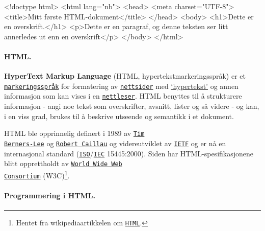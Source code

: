\documentclass[%
oneside,                 %
final,                   %
10pt]{article}
\newenvironment{notice_mdfboxadmon}[1][]{
\begin{notice_mdfboxmdframed}[frametitle=#1]
}
{
\end{notice_mdfboxmdframed}
}
\begin{document}
\begin{notice_mdfboxadmon}
\bhtml
<!doctype html>
<html lang="nb">
<head>
	<meta charset="UTF-8">
	<title>Mitt første HTML-dokument</title>
</head>
<body>
	<h1>Dette er en overskrift.</h1> 
	<p>Dette er en paragraf, og denne teksten ser litt annerledes 
          ut enn en overskrift</p>
</body>
</html>

\ehtml
\end{notice_mdfboxadmon}

 


\paragraph{HTML.}
\label{section:teori:html} 

\textbf{HyperText Markup Language} (HTML, hypertekstmarkeringsspråk) er et
\href{{http://no.wikipedia.org/wiki/Markeringsspråk}}{\nolinkurl{markeringsspråk}} for
formatering av \href{{http://no.wikipedia.org/wiki/Nettside}}{\nolinkurl{nettsider}}
med \href{{http://no.wikipedia.org/wiki/Hypertekst}}{`hypertekst'} og annen
informasjon som kan vises i en
\href{{http://no.wikipedia.org/wiki/Nettleser}}{\nolinkurl{nettleser}}. HTML benyttes
til å strukturere informasjon - angi noe tekst som overskrifter,
avsnitt, lister og så videre - og kan, i en viss grad, brukes til å
beskrive utseende og semantikk i et dokument.

HTML ble opprinnelig definert i 1989 av \href{{https://no.wikipedia.org/wiki/Tim_Berners-Lee}}{\nolinkurl{Tim
Berners-Lee}} og
\href{{https://en.wikipedia.org/wiki/Robert_Cailliau}}{\nolinkurl{Robert Caillau}} og
videreutviklet av \href{{http://no.wikipedia.org/wiki/IETF}}{\nolinkurl{IETF}} og er
nå en internasjonal standard
(\href{{http://no.wikipedia.org/wiki/International_Organization_for_Standardization}}{\nolinkurl{ISO}}/\href{{http://no.wikipedia.org/wiki/International_Electrotechnical_Commission}}{\nolinkurl{IEC}}
15445:2000). Siden har HTML-spesifikasjonene blitt opprettholdt av
\href{{http://no.wikipedia.org/wiki/World_Wide_Web_Consortium}}{\nolinkurl{World Wide Web
Consortium}}
(W3C)\footnote{Hentet fra wikipediaartikkelen om \href{{http://no.wikipedia.org/wiki/HTML}}{\nolinkurl{HTML}}.}. 



\paragraph{Programmering i HTML.}
\end{document}
